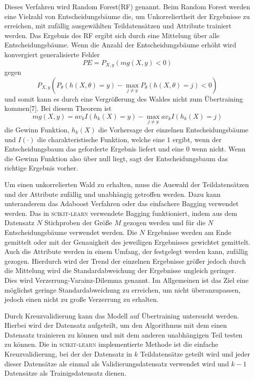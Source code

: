 Dieses Verfahren wird Random Forest(RF) genannt. Beim Random Forest werden eine Vielzahl von Entscheidungsbäume die, um Unkorreliertheit der Ergebnisse zu erreichen, mit
zufällig ausgewählten Teildatensätzen und Attribute trainiert werden. Das Ergebnis des RF ergibt sich durch eine Mittelung über alle Entscheidungsbäume.
Wenn die Anzahl der Entscheidungsbäume erhöht wird konvergiert generalisierte Fehler
\begin{equation}
  PE = P_{X,y}(mg(X,y)<0)
\end{equation}
gegen
\begin{equation}
  P_{X,y}(P_\theta(h(X,\theta)=y)-\max_{j\neq y}P_\theta(h(X,\theta)=j)<0)
\end{equation}
und somit kann es durch eine Vergrößerung des Waldes nicht zum Übertraining kommen[7]\cite{RandomForests_Breiman}. Bei diesem Theorem ist
\begin{equation}
  mg(X,y) = av_k I(h_k(X)=y) - \max_{j \neq y}av_k I(h_k(X)=j)
\end{equation}
die Gewinn Funktion, $h_k(X)$ die Vorhersage der einzelnen Entscheidungsbäume und $I(\cdot)$ die charakteristische Funktion, welche eine $1$ ergibt, wenn der
Entscheidungsbaum das geforderte Ergebnis liefert und eine $0$ wenn nicht. Wenn die Gewinn Funktion also über null liegt, sagt der Entscheidungsbaum das richtige Ergebnis vorher.

Um einen unkorrelierten Wald zu erhalten, muss die Auswahl der Teildatensätzen und der Attribute zufällig und unabhängig getroffen werden. Dazu kann unteranderem das Adaboost
Verfahren oder das einfachere Bagging verwendet werden. Das in \textsc{scikit-learn} verwendete Bagging funktioniert, indem aus dem Datensatz $N$ Stichproben der Größe
$M$ gezogen werden und für die $N$ Entscheidungsbäume verwendet werden. Die $N$ Ergebnisse werden am Ende gemittelt oder mit der Genauigkeit des jeweiligen Ergebnisses gewichtet
gemittelt. Auch die Attribute werden in einem Umfang, der festgelegt werden kann, zufällig gezogen. Hierdurch wird der Trend der einzelnen Ergebnisse größer jedoch durch die
Mittelung wird die Standardabweichung der Ergebnisse ungleich geringer. Dies wird Verzerrung-Varainz-Dilemma genannt. Im Allgemeinen ist das Ziel eine möglichst
geringe Standardabweichung zu erreichen, um nicht überanzupassen, jedoch einen nicht zu große Verzerrung zu erhalten.

Durch Kreuzvalidierung kann das Modell auf Übertraining untersucht werden. Hierbei wird der Datensatz aufgeteilt, um
den Algorithmus mit dem einen Datensatz trainieren zu können und mit dem anderen unabhängigen Teil testen zu können. Die in \textsc{scikit-learn} implementierte
Methode ist die einfache Kreuzvalidierung, bei der der Datensatz in $k$ Teildatensätze geteilt wird und jeder dieser Datensätze als einmal als Validierungsdatensatz
verwendet wird und $k-1$ Datensätze als Trainigsdatensatz dienen.

